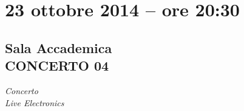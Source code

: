 \documentclass[8pt, twoside, a5paper]{extreport}
\begin{document}
\begin{Parallel}[c]{0.47\textwidth}{0.47\textwidth}
	


	\ParallelPar
	\clearpage


\section*{23 ottobre 2014 -- ore 20:30}
\subsection*{\textsf{Sala Accademica\\
	{\small CONCERTO 04\\}}}

{\fontsize{50}{60}\selectfont \textit{Concerto\\ Live Electronics}}
\bigskip


\section*{}
	
	



\end{Parallel}
\end{document}
